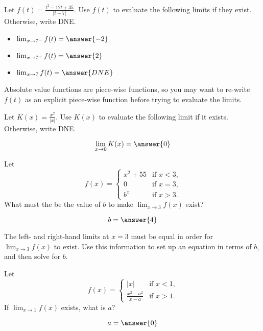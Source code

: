 \documentclass[handout]{ximera}
\begin{document}
\begin{exercise}
Let $f(t) = \frac{t^2 - 12t +35}{|t-7|}$.  Use $f(t)$ to evaluate the following limits if they exist.  Otherwise, write DNE.

\begin{itemize}

\item [] $\lim_{x \to 7^-} f(t) = \answer{-2}$

\item [] $\lim_{x \to 7^+} f(t) = \answer{2}$

\item [] $\lim_{x \to 7} f(t) = \answer{DNE}$

\end{itemize}

\begin{hint}
Absolute value functions are piece-wise functions, so you may want to re-write $f(t)$ as an explicit piece-wise function before trying to evaluate the limits. 
\end{hint}

\end{exercise}

\begin{exercise}
Let $K(x) = \frac{x^2}{|x|}$.  Use $K(x)$ to evaluate the following limit if it exists.  Otherwise, write DNE.

\[
\lim_{x \to 0} K(x) = \answer{0}
\]

\end{exercise}

\begin{exercise}
Let
\[
f(x) =
\begin{cases} x^2+55 &\text{if $x<3$,}\\
  0 &\text{if $x=3$,} \\
  b^x &\text{if $x>3$.}
\end{cases}
\]  
What must the be the value of $b$ to make $\displaystyle\lim_{x \to 3} f(x)$ exist?

\[
b = \answer{4}
\]

\begin{hint}
  The left- and right-hand limits at $x=3$ must be equal in order for $\displaystyle\lim_{x \to 3} f(x)$ to exist.  Use this information to
  set up an equation in terms of $b$, and then solve for $b$.
\end{hint}
\end{exercise}

\begin{exercise}
Let
\[
f(x) = \begin{cases}
  |x| &\text{if $x<1$,} \\
  \frac{x^2-a^2}{x-a} &\text{if $x>1$.}
\end{cases}
\]
If $\displaystyle\lim_{x \to 1} f(x)$ exists, what is $a$?

  \[
a = \answer{0}
\]

\end{exercise}
\end{document}
